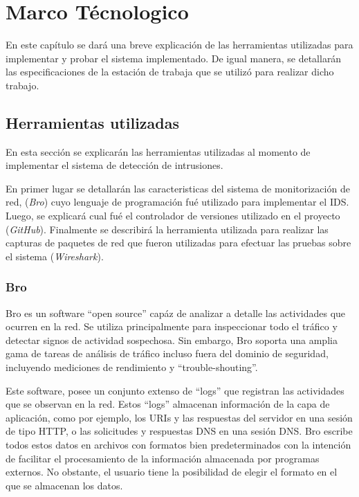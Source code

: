 \chapter{Marco Técnologico}
\label{capituloTecnologico}

En este capítulo se dará una breve explicación de las herramientas utilizadas para implementar y probar el sistema implementado. De igual manera, se detallarán las especificaciones de la estación de trabaja que se utilizó para realizar dicho trabajo.  

\section{Herramientas utilizadas}

En esta sección se explicarán las herramientas utilizadas al momento de implementar el sistema  de detección de intrusiones.

En primer lugar se detallarán las caracteristicas del sistema de monitorización de red, (\textit{Bro}) cuyo lenguaje de programación fué utilizado para implementar el IDS. Luego, se explicará cual fué el controlador de versiones utilizado en el proyecto (\textit{GitHub}). Finalmente se describirá la herramienta utilizada para realizar las capturas de paquetes de red que fueron utilizadas para efectuar las pruebas sobre el sistema (\textit{Wireshark}).  

\subsection{Bro}\label{ssec:Bro}

Bro es un software ``open source'' capáz de analizar a detalle las actividades que ocurren en la red. Se utiliza principalmente para inspeccionar todo el tráfico y detectar signos de actividad sospechosa. Sin embargo, Bro soporta una amplia gama de tareas de análisis de tráfico incluso fuera del dominio de seguridad, incluyendo mediciones de rendimiento y ``trouble-shouting''.\cite{Bro}

Este software, posee un conjunto extenso de ``logs'' que registran las actividades que se observan en la red. Estos ``logs'' almacenan información de la capa de aplicación, como por ejemplo, los URIs y las respuestas del servidor en una sesión de tipo HTTP, o las solicitudes y respuestas DNS en una sesión DNS. Bro escribe todos estos datos en archivos con formatos bien predeterminados con la intención de facilitar el procesamiento de la información almacenada por programas externos. No obstante, el usuario tiene la posibilidad de elegir el formato en el que se almacenan los datos.

